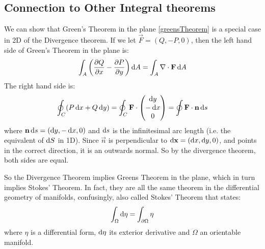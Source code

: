 \documentclass[../main.tex]{subfiles}
\begin{document}
\subsection{Connection to Other Integral theorems}
\nonexaminable
We can show that Green's Theorem in the plane \cref{greensTheorem} is a special case in 2D of the Divergence theorem.
If we let $\vec{F} = (Q, -P, 0)$, then the left hand side of Green's Theorem in the plane is:
\[
  \int_{A} \left(\pderiv{Q}{x} - \pderiv{P}{y}\right) \d{A} = \int_{A} \nabla \cdot \vec{F} \d{A}
\]
The right hand side is:
\[
  \oint_{C} (P \d{x} + Q \d{y}) = \oint_{C} \vec{F} \cdot \begin{pmatrix}
  \d{y} \\
  -\d{x} \\
  0 \\
  \end{pmatrix} = \oint \vec{F} \cdot \vec{n} \d{s}
\]
where $\vec{n} \d{s} = (\d{y, -\d{x}, 0})$ and $\d{s}$ is the infinitesimal arc length (i.e. the equivalent of $\d{S}$ in 1D).
Since $\vec{n}$ is perpendicular to $\d{\vec{x}} = (\d{x}, \d{y}, 0)$, and points in the correct direction, it is an outwards normal.
So by the divergence theorem, both sides are equal.

So the Divergence Theorem implies Greens Theorem in the plane, which in turn implies Stokes' Theorem.
In fact, they are all the same theorem in the differential geometry of manifolds, confusingly, also called Stokes' Theorem that states:
\[
  \int_{\Omega}  \d{\eta} = \int_{\partial \Omega} \eta
\]
where $\eta$ is a differential form, $\d{\eta}$ its exterior derivative and $\Omega$ an orientable manifold.
\end{document}
